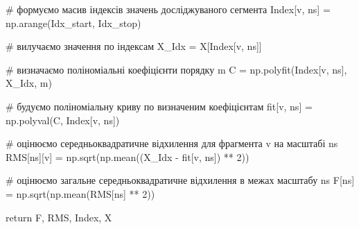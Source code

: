 \documentclass[
  letterpaper,
]{report}
\newenvironment{Shaded}{\begin{snugshade}}{\end{snugshade}}
\newcommand{\CommentTok}[1]{\textcolor[rgb]{0.37,0.37,0.37}{#1}}
\newcommand{\ControlFlowTok}[1]{\textcolor[rgb]{0.00,0.23,0.31}{#1}}
\newcommand{\DecValTok}[1]{\textcolor[rgb]{0.68,0.00,0.00}{#1}}
\newcommand{\NormalTok}[1]{\textcolor[rgb]{0.00,0.23,0.31}{#1}}
\newcommand{\OperatorTok}[1]{\textcolor[rgb]{0.37,0.37,0.37}{#1}}
\begin{document}
\begin{Shaded}
\begin{Highlighting}[]
            \CommentTok{\# формуємо масив індексів значень досліджуваного сегмента}
\NormalTok{            Index[v, ns] }\OperatorTok{=}\NormalTok{ np.arange(Idx\_start, Idx\_stop)  }

            \CommentTok{\# вилучаємо значення по індексам}
\NormalTok{            X\_Idx }\OperatorTok{=}\NormalTok{ X[Index[v, ns]]                       }

            \CommentTok{\# визначаємо поліноміальні коефіцієнти порядку m}
\NormalTok{            C }\OperatorTok{=}\NormalTok{ np.polyfit(Index[v, ns], X\_Idx, m) }
            
            \CommentTok{\# будуємо поліноміальну криву по визначеним коефіцієнтам}
\NormalTok{            fit[v, ns] }\OperatorTok{=}\NormalTok{ np.polyval(C, Index[v, ns])  }

            \CommentTok{\# оцінюємо середньоквадратичне відхилення для фрагмента v на масштабі ns }
\NormalTok{            RMS[ns][v] }\OperatorTok{=}\NormalTok{ np.sqrt(np.mean((X\_Idx }\OperatorTok{{-}}\NormalTok{ fit[v, ns]) }\OperatorTok{**} \DecValTok{2}\NormalTok{)) }

        \CommentTok{\# оцінюємо загальне середньоквадратичне відхилення в межах масштабу ns}
\NormalTok{        F[ns] }\OperatorTok{=}\NormalTok{ np.sqrt(np.mean(RMS[ns] }\OperatorTok{**} \DecValTok{2}\NormalTok{))}

    \ControlFlowTok{return}\NormalTok{ F, RMS, Index, X}
\end{Highlighting}
\end{Shaded}
\end{document}
